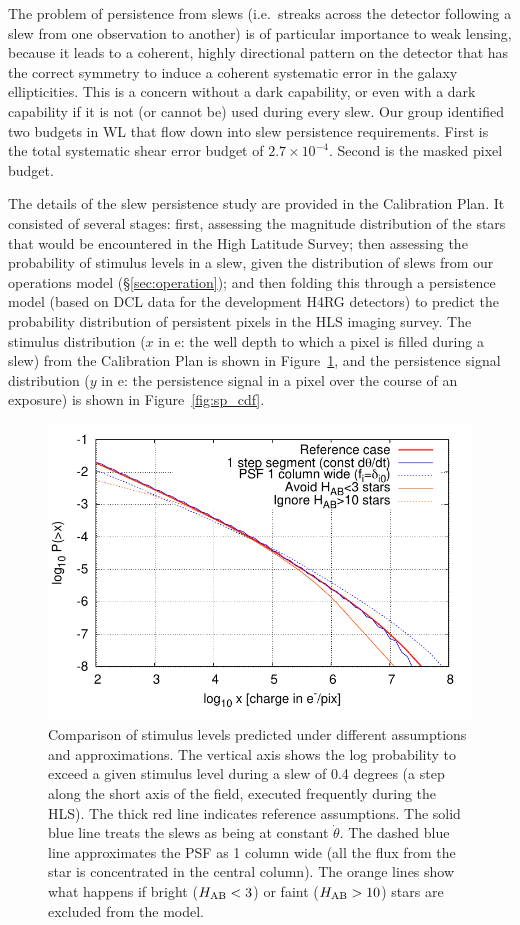 The problem of persistence from slews (i.e.\ streaks across the detector
following a slew from one observation to another) is of particular importance to
weak lensing, because it leads to a coherent, highly directional pattern on the
detector that has the correct symmetry to induce a coherent systematic error in
the galaxy ellipticities. This is a concern without a dark capability, or even
with a dark capability if it is not (or cannot be) used during every slew. Our
group identified two budgets in WL that flow down into slew persistence
requirements. First is the total systematic shear error budget of $2.7\times
10^{-4}$. Second is the masked pixel budget.

The details of the slew persistence study are provided in the Calibration Plan.
It consisted of several stages: first, assessing the magnitude distribution of
the stars that would be encountered in the High Latitude Survey; then assessing
the probability of stimulus levels in a slew, given the distribution of slews
from our operations model (\S\ref{sec:operation}); and then folding this through
a persistence model (based on DCL data for the development H4RG detectors) to
predict the probability distribution of persistent pixels in the HLS imaging
survey. The stimulus distribution ($x$ in e: the well depth to which a pixel is
filled during a slew) from the Calibration Plan is shown in
Figure~\ref{fig:slewcompare}, and the persistence signal distribution ($y$ in e:
the persistence signal in a pixel over the course of an exposure) is shown in
Figure~\ref{fig:sp_cdf}.

\begin{figure}
\includegraphics[width=5in]{Plots/slew_compare.pdf}
\caption{\label{fig:slewcompare}Comparison of stimulus levels predicted
under different assumptions and approximations. The vertical axis
shows the log probability to exceed a given stimulus level during a
slew of 0.4 degrees (a step along the short axis of the field,
executed frequently during the HLS). The thick red line indicates
reference assumptions. The solid blue line treats the slews as being
at constant $\dot\theta$. The dashed blue line approximates the PSF as
1 column wide (all the flux from the star is concentrated in the
central column). The orange lines show what happens if bright ($H_{\rm
AB}<3$) or faint ($H_{\rm AB}>10$) stars are excluded from the model.}
\end{figure}

